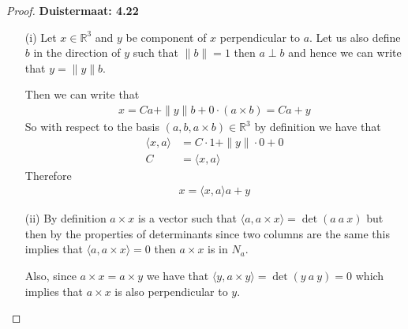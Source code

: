 \documentclass[11pt]{article}
\newcommand{\R}{\mathbb{R}}
\theoremstyle{definition}
\begin{document}
\begin{proof}{\textbf{Duistermaat: 4.22}}
\begin{itemize}
    \item [(i)] Let $x \in \R^3$ and $y$ be component of $x$ perpendicular to 
    $a$. Let us also define $b$ in the direction of $y$ such that $\|b\| = 1$
    then $a \perp b$ and hence we can write that $y = \|y\|b$.

    Then we can write that
    \begin{align*}
        x = Ca + \|y\|b + 0\cdot (a \times b) = Ca + y
    \end{align*}
    So with respect to the basis $(a, b, a\times b) \in \R^3$ by definition we
    have that
    \begin{align*}
        \langle x, a\rangle &= C\cdot 1 + \|y\| \cdot 0 + 0\\
        C &= \langle x, a\rangle
    \end{align*}
    Therefore
    \begin{align*}
        x = \langle x, a\rangle a + y
    \end{align*}
    \item [(ii)] By definition $a \times x$ is a vector such that 
    $\langle a, a \times x \rangle = \det(a~a~x)$
    but then by the properties of determinants since two columns are the same
    this implies that $\langle a, a \times x \rangle = 0$ then
    $a\times x$ is in $N_a$.

    Also, since $a\times x = a \times y$ we have that
    $\langle y, a \times y \rangle = \det(y~a~y) = 0$ which implies that
    $a \times x$ is also perpendicular to $y$.


\end{itemize}
\end{proof}
\end{document}
